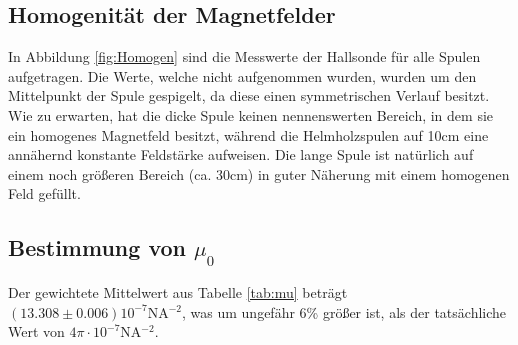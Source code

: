\documentclass[12pt,a4paper,titlepage,headinclude,bibtotoc]{scrartcl}
\begin{document}
\subsection{Homogenität der Magnetfelder}
In Abbildung \ref{fig:Homogen} sind die Messwerte der Hallsonde für alle Spulen aufgetragen.
Die Werte, welche nicht aufgenommen wurden, wurden um den Mittelpunkt der Spule gespigelt, da diese einen symmetrischen Verlauf besitzt.
Wie zu erwarten, hat die dicke Spule keinen nennenswerten Bereich, in dem sie ein homogenes Magnetfeld besitzt, während die Helmholzspulen auf 10cm eine annähernd konstante Feldstärke aufweisen.
Die lange Spule ist natürlich auf einem noch größeren Bereich (ca. 30cm) in guter Näherung mit einem homogenen Feld gefüllt.


\subsection{Bestimmung von $\mu_0$}
Der gewichtete Mittelwert aus Tabelle \ref{tab:mu} beträgt  $(13.308\pm 0.006)10^{-7}\si{\newton\ampere^{-2}}$, was um ungefähr 6\% größer ist, als der tatsächliche Wert von $4\pi\cdot10^{-7}\si{\newton\ampere^{-2}}$.



\end{document}

